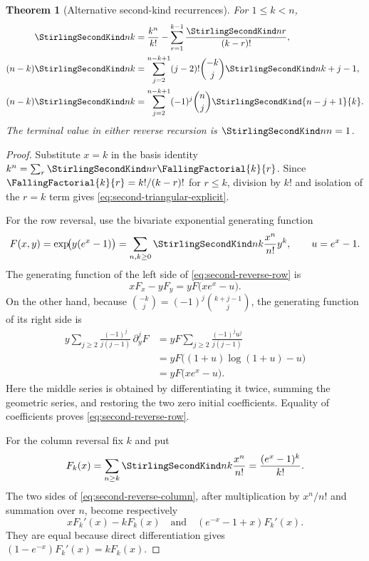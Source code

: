 \documentclass[11pt,a4paper,oneside,openany]{book}
\newtheorem{theorem}{Theorem}[chapter]
\theoremstyle{definition}
\theoremstyle{remark}
\begin{document}
\begin{theorem}[Alternative second-kind recurrences]
\label{thm:second-reverse-recurrences}
For $1\le k<n$,
\begin{align}
 \StirlingSecondKind nk
 &=\frac{k^n}{k!}-\sum_{r=1}^{k-1}\frac{\StirlingSecondKind nr}{(k-r)!},
 \label{eq:second-triangular-explicit}\\
 (n-k)\StirlingSecondKind nk
 &=\sum_{j=2}^{n-k+1}(j-2)!\binom{-k}{j}
   \StirlingSecondKind n{k+j-1},
 \label{eq:second-reverse-row}\\
 (n-k)\StirlingSecondKind nk
 &=\sum_{j=2}^{n-k+1}(-1)^j\binom nj
   \StirlingSecondKind{n-j+1}{k}.
 \label{eq:second-reverse-column}
\end{align}
The terminal value in either reverse recursion is $\StirlingSecondKind nn=1$.
\end{theorem}
\begin{proof}
Substitute $x=k$ in the basis identity
$k^n=\sum_r\StirlingSecondKind nr\FallingFactorial{k}{r}$.  Since
$\FallingFactorial{k}{r}=k!/(k-r)!$ for $r\le k$, division by $k!$ and isolation of the
$r=k$ term gives \eqref{eq:second-triangular-explicit}.

For the row reversal, use the bivariate exponential generating function
\[
 F(x,y)=\exp\!\bigl(y(e^x-1)\bigr)
 =\sum_{n,k\ge0}\StirlingSecondKind nk\frac{x^n}{n!}y^k,
 \qquad u=e^x-1.
\]
The generating function of the left side of
\eqref{eq:second-reverse-row} is
\[
 xF_x-yF_y=yF\bigl(xe^x-u\bigr).
\]
On the other hand, because
$\binom{-k}{j}=(-1)^j\binom{k+j-1}{j}$, the generating function of its right side is
\begin{align*}
 y\sum_{j\ge2}\frac{(-1)^j}{j(j-1)}\,\partial_y^jF
 &=yF\sum_{j\ge2}\frac{(-1)^ju^j}{j(j-1)}\\
 &=yF\bigl((1+u)\log(1+u)-u\bigr)\\
 &=yF\bigl(xe^x-u\bigr).
\end{align*}
Here the middle series is obtained by differentiating it twice, summing the
geometric series, and restoring the two zero initial coefficients.  Equality of
coefficients proves \eqref{eq:second-reverse-row}.

For the column reversal fix $k$ and put
\[
 F_k(x)=\sum_{n\ge k}\StirlingSecondKind nk\frac{x^n}{n!}
       =\frac{(e^x-1)^k}{k!}.
\]
The two sides of \eqref{eq:second-reverse-column}, after multiplication by
$x^n/n!$ and summation over $n$, become respectively
\[
 xF_k'(x)-kF_k(x)
 \quad\text{and}\quad
 (e^{-x}-1+x)F_k'(x).
\]
They are equal because direct differentiation gives
$(1-e^{-x})F_k'(x)=kF_k(x)$.
\end{proof}
\end{document}
